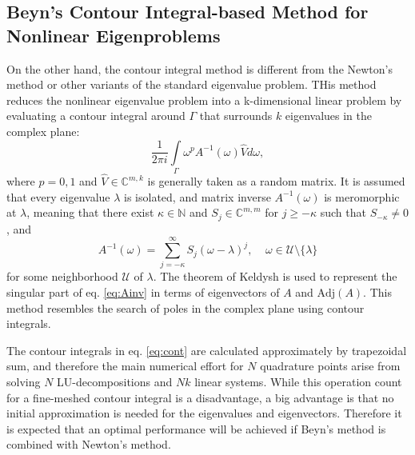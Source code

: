\documentclass[11pt,letterpaper]{article}
\begin{document}
\subsection*{Beyn's Contour Integral-based Method for Nonlinear Eigenproblems}
On the other hand, the contour integral method is different from the Newton's method or other variants of the standard eigenvalue problem. THis method reduces the nonlinear eigenvalue problem into a k-dimensional linear problem by evaluating a contour integral around $\Gamma$ that surrounds $k$ eigenvalues in the complex plane:
\begin{equation}\label{eq:cont}
\frac{1}{2\pi i}\int\limits_{\Gamma}\omega^p A^{-1}(\omega)\hat{V}d\omega,
\end{equation}
where $p=0,1$ and $\hat{V} \in \mathbb{C}^{m,k}$ is generally taken as a random matrix. It is assumed that every eigenvalue $\lambda$ is isolated, and matrix inverse $A^{-1}(\omega)$ is meromorphic at $\lambda$, meaning that there exist $\kappa\in\mathbb{N}$ and $S_j\in \mathbb{C}^{m,m}$ for $j\geq -\kappa$ such that $S_{-\kappa}\neq 0$, and 
\begin{equation}\label{eq:Ainv}
A^{-1}(\omega)=\sum\limits_{j=-\kappa}^{\infty} S_j (\omega-\lambda)^j,\;\;
\;\; \omega \in \mathcal{U} \setminus \lbrace\lambda\rbrace 
\end{equation}
for some neighborhood $\mathcal{U}$ of $\lambda$. The theorem of Keldysh\citep{keldysh1951characteristic} is used to represent the singular part of eq. \ref{eq:Ainv} in terms of eigenvectors of $A$ and $\mathrm{Adj}(A)$. This method resembles the search of poles in the complex plane using contour integrals. 

The contour integrals in eq. \ref{eq:cont} are calculated approximately by trapezoidal sum, and therefore the main numerical effort for $N$ quadrature points arise from solving $N$ LU-decompositions and $Nk$ linear systems. While this operation count for a fine-meshed contour integral is a disadvantage, a big advantage is that no initial approximation is needed for the eigenvalues and eigenvectors. Therefore it is expected that an optimal performance will be achieved if Beyn's method is combined with Newton's method. 
\end{document}
